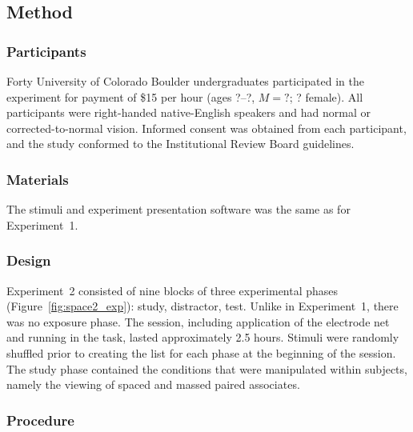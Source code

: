 \subsection{Method}

\subsubsection{Participants}


Forty University of Colorado Boulder undergraduates participated in the experiment for payment of \$15 per hour (ages ?--?, $M=?$; ? female).  All participants were right-handed native-English speakers and had normal or corrected-to-normal vision.  Informed consent was obtained from each participant, and the study conformed to the Institutional Review Board guidelines.

\subsubsection{Materials}

The stimuli and experiment presentation software was the same as for Experiment~1.

\subsubsection{Design}

Experiment~2 consisted of nine blocks of three experimental phases (Figure~\ref{fig:space2_exp}): study, distractor, test.  Unlike in Experiment~1, there was no exposure phase.  The session, including application of the electrode net and running in the task, lasted approximately 2.5 hours.  Stimuli were randomly shuffled prior to creating the list for each phase at the beginning of the session.  The study phase contained the conditions that were manipulated within subjects, namely the viewing of spaced and massed paired associates.

\subsubsection{Procedure}

